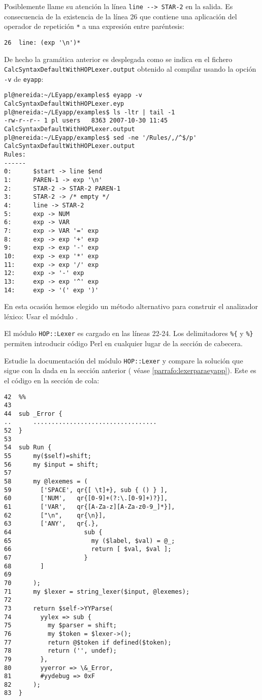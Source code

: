 Posiblemente llame su atención la línea \verb|line --> STAR-2| en la salida.
Es consecuencia de la existencia de la línea 26 que contiene una aplicación
del operador de repetición \verb|*| a una expresión entre paréntesis:
\begin{verbatim}
26  line: (exp '\n')*
\end{verbatim}
De hecho la gramática anterior es desplegada como se indica 
en el fichero \verb|CalcSyntaxDefaultWithHOPLexer.output|
obtenido al compilar usando la opción \verb|-v| de \verb|eyapp|:
\begin{verbatim}
pl@nereida:~/LEyapp/examples$ eyapp -v CalcSyntaxDefaultWithHOPLexer.eyp
pl@nereida:~/LEyapp/examples$ ls -ltr | tail -1
-rw-r--r-- 1 pl users   8363 2007-10-30 11:45 CalcSyntaxDefaultWithHOPLexer.output
pl@nereida:~/LEyapp/examples$ sed -ne '/Rules/,/^$/p' CalcSyntaxDefaultWithHOPLexer.output
Rules:
------
0:      $start -> line $end
1:      PAREN-1 -> exp '\n'
2:      STAR-2 -> STAR-2 PAREN-1
3:      STAR-2 -> /* empty */
4:      line -> STAR-2
5:      exp -> NUM
6:      exp -> VAR
7:      exp -> VAR '=' exp
8:      exp -> exp '+' exp
9:      exp -> exp '-' exp
10:     exp -> exp '*' exp
11:     exp -> exp '/' exp
12:     exp -> '-' exp
13:     exp -> exp '^' exp
14:     exp -> '(' exp ')'
\end{verbatim}


En esta ocasión hemos elegido un método alternativo para construir el
analizador léxico: Usar el módulo 
.

El módulo \verb|HOP::Lexer|
es cargado en las líneas 22-24. Los delimitadores \verb|%{|
y \verb|%}| permiten introducir código Perl en cualquier
lugar de la sección de cabecera.

Estudie la documentación del módulo \verb|HOP::Lexer|
y compare la solución que sigue con la dada
en la sección anterior  ( véase \ref{parrafo:lexerparaeyapp}).
Este es el código en la sección de cola:

\begin{verbatim}
42  %%
43
44  sub _Error {
..      ..................................
52  }
53
54  sub Run {
55      my($self)=shift;
56      my $input = shift;
57
58      my @lexemes = (
59        ['SPACE', qr{[ \t]+}, sub { () } ],
60        ['NUM',   qr{[0-9]+(?:\.[0-9]+)?}],
61        ['VAR',   qr{[A-Za-z][A-Za-z0-9_]*}],
62        ["\n",    qr{\n}],
63        ['ANY',   qr{.},
64                    sub {
65                      my ($label, $val) = @_;
66                      return [ $val, $val ];
67                    }
68        ]
69
70      );
71      my $lexer = string_lexer($input, @lexemes);
72
73      return $self->YYParse(
74        yylex => sub {
75          my $parser = shift;
76          my $token = $lexer->();
77          return @$token if defined($token);
78          return ('', undef);
79        },
80        yyerror => \&_Error,
81        #yydebug => 0xF
82      );
83  }
\end{verbatim}

